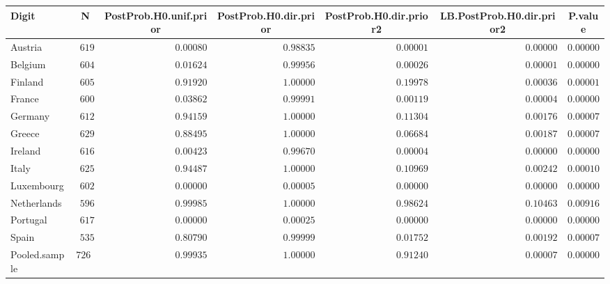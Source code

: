 \begin{table}[!tbp]
\begin{center}
\begin{tabular}{lrrrrrr}
\hline\hline
\multicolumn{1}{l}{Digit}&\multicolumn{1}{c}{N}&\multicolumn{1}{c}{PostProb.H0.unif.prior}&\multicolumn{1}{c}{PostProb.H0.dir.prior}&\multicolumn{1}{c}{PostProb.H0.dir.prior2}&\multicolumn{1}{c}{LB.PostProb.H0.dir.prior2}&\multicolumn{1}{c}{P.value}\tabularnewline
\hline
Austria&$ 619$&$0.00080$&$0.98835$&$0.00001$&$0.00000$&$0.00000$\tabularnewline
Belgium&$ 604$&$0.01624$&$0.99956$&$0.00026$&$0.00001$&$0.00000$\tabularnewline
Finland&$ 605$&$0.91920$&$1.00000$&$0.19978$&$0.00036$&$0.00001$\tabularnewline
France&$ 600$&$0.03862$&$0.99991$&$0.00119$&$0.00004$&$0.00000$\tabularnewline
Germany&$ 612$&$0.94159$&$1.00000$&$0.11304$&$0.00176$&$0.00007$\tabularnewline
Greece&$ 629$&$0.88495$&$1.00000$&$0.06684$&$0.00187$&$0.00007$\tabularnewline
Ireland&$ 616$&$0.00423$&$0.99670$&$0.00004$&$0.00000$&$0.00000$\tabularnewline
Italy&$ 625$&$0.94487$&$1.00000$&$0.10969$&$0.00242$&$0.00010$\tabularnewline
Luxembourg&$ 602$&$0.00000$&$0.00005$&$0.00000$&$0.00000$&$0.00000$\tabularnewline
Netherlands&$ 596$&$0.99985$&$1.00000$&$0.98624$&$0.10463$&$0.00916$\tabularnewline
Portugal&$ 617$&$0.00000$&$0.00025$&$0.00000$&$0.00000$&$0.00000$\tabularnewline
Spain&$ 535$&$0.80790$&$0.99999$&$0.01752$&$0.00192$&$0.00007$\tabularnewline
Pooled.sample&$7260$&$0.99935$&$1.00000$&$0.91240$&$0.00007$&$0.00000$\tabularnewline
\hline
\end{tabular}\end{center}
\end{table}
